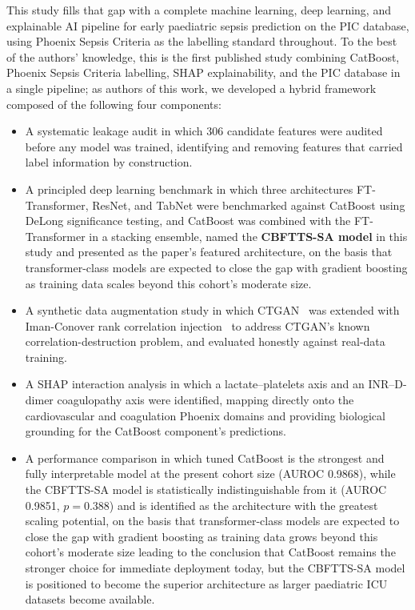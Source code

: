 \documentclass[final,3p,times]{elsarticle}
\begin{document}
This study fills that gap with a complete machine learning, deep
learning, and explainable AI pipeline for early paediatric sepsis
prediction on the PIC database, using Phoenix Sepsis Criteria as
the labelling standard throughout. To the best of the authors'
knowledge, this is the first published study combining CatBoost,
Phoenix Sepsis Criteria labelling, SHAP explainability, and the PIC
database in a single pipeline; as authors of this work, we developed
a hybrid framework composed of the following four components:

\begin{itemize}
    \item A systematic leakage audit in which 306 candidate
    features were audited before any model was trained, identifying
    and removing features that carried label information by
    construction.
    \item A principled deep learning benchmark in which three
    architectures  FT-Transformer, ResNet, and TabNet  were
    benchmarked against CatBoost using DeLong significance testing,
    and CatBoost was combined with the FT-Transformer in a stacking
    ensemble, named the \textbf{CBFTTS-SA model} in this study and
    presented as the paper's featured architecture, on the basis
    that transformer-class models are expected to close the gap
    with gradient boosting as training data scales beyond this
    cohort's moderate size.
    \item A synthetic data augmentation study in which CTGAN~\cite{xu2019}
    was extended with Iman-Conover rank correlation injection~\cite{iman1982}
    to address CTGAN's known correlation-destruction problem, and
    evaluated honestly against real-data training.
    \item A SHAP interaction analysis in which a lactate--platelets
    axis and an INR--D-dimer coagulopathy axis were identified,
    mapping directly onto the cardiovascular and coagulation
    Phoenix domains and providing biological grounding for the
    CatBoost component's predictions.
    \item A performance comparison in which tuned CatBoost is the
    strongest and fully interpretable model at the present cohort
    size (AUROC 0.9868), while the CBFTTS-SA model is statistically
    indistinguishable from it (AUROC 0.9851, $p = 0.388$) and is
    identified as the architecture with the greatest scaling
    potential, on the basis that transformer-class models are
    expected to close the gap with gradient boosting as training
    data grows beyond this cohort's moderate size  leading to the
    conclusion that CatBoost remains the stronger choice for
    immediate deployment today, but the CBFTTS-SA model is positioned to
    become the superior architecture as larger paediatric ICU
    datasets become available.
\end{itemize}
\end{document}
